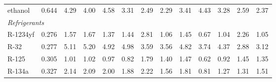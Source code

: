 \begin{table}[H]
\begin{tabular}{lcccccccccccc}
ethanol & 0.644 & 4.29 & 4.00 & 4.58 & 3.31 & 2.49 & 2.29 & 3.41 & 4.43 & 3.28 & 2.59 & 2.37 \\
\multicolumn{15}{l}{\emph{Refrigerants}} \\
R-1234yf & 0.276 & 1.57 & 1.67 & 1.37 & 1.44 & 2.81 & 1.06 & 1.45 & 0.67 & 1.04 & 2.26 & 1.05 \\
R-32 & 0.277 & 5.11 & 5.20 & 4.92 & 4.98 & 3.59 & 3.56 & 4.82 & 3.74 & 4.37 & 2.88 & 3.12 \\
R-125 & 0.305 & 1.01 & 1.02 & 0.97 & 0.82 & 1.79 & 1.40 & 1.47 & 0.62 & 0.92 & 1.45 & 1.35 \\
R-134a & 0.327 & 2.14 & 2.09 & 2.00 & 1.88 & 2.22 & 1.56 & 1.81 & 0.81 & 1.27 & 1.31 & 1.51 \\
\bottomrule
\end{tabular}
\end{table}
